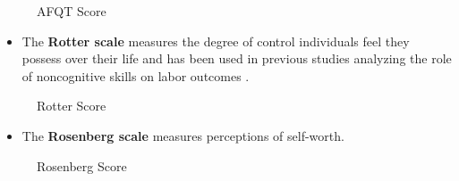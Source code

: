 \begin{frame}\begin{figure}[htp]\centering
\caption{AFQT Score}
\end{figure}\end{frame}
\begin{frame}
\begin{itemize}
\item The \textbf{Rotter scale} \citep{Rotter.1966} measures the degree of control individuals feel they
possess over their life and has been used in previous studies analyzing
the role of noncognitive skills on labor outcomes \citep{Osborne-Groves.2005}.
\end{itemize}
\end{frame}
\begin{frame}\begin{figure}[htp]\centering
\caption{Rotter Score}
\end{figure}\end{frame}
\begin{frame}
\begin{itemize}
\item The \textbf{Rosenberg scale} \citep{Rosenberg.1965} measures perceptions of self-worth.
\end{itemize}
\end{frame}
\begin{frame}\begin{figure}[htp]\centering
\caption{Rosenberg Score}
\end{figure}\end{frame}
